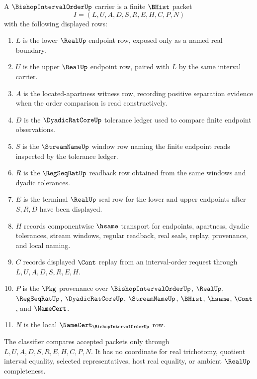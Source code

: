 \begin{definition}
\label{def:bishop-interval-order-carrier}
A $\BishopIntervalOrderUp$ carrier is a finite $\BHist$ packet
$$
I=(L,U,A,D,S,R,E,H,C,P,N)
$$
with the following displayed rows:
\begin{enumerate}
\item $L$ is the lower $\RealUp$ endpoint row, exposed only as a named real boundary.
\item $U$ is the upper $\RealUp$ endpoint row, paired with $L$ by the same interval carrier.
\item $A$ is the located-apartness witness row, recording positive separation evidence when the order comparison is read constructively.
\item $D$ is the $\DyadicRatCoreUp$ tolerance ledger used to compare finite endpoint observations.
\item $S$ is the $\StreamNameUp$ window row naming the finite endpoint reads inspected by the tolerance ledger.
\item $R$ is the $\RegSeqRatUp$ readback row obtained from the same windows and dyadic tolerances.
\item $E$ is the terminal $\RealUp$ seal row for the lower and upper endpoints after $S,R,D$ have been displayed.
\item $H$ records componentwise $\hsame$ transport for endpoints, apartness, dyadic tolerances, stream windows, regular readback, real seals, replay, provenance, and local naming.
\item $C$ records displayed $\Cont$ replay from an interval-order request through $L,U,A,D,S,R,E,H$.
\item $P$ is the $\Pkg$ provenance over $\BishopIntervalOrderUp$, $\RealUp$, $\RegSeqRatUp$, $\DyadicRatCoreUp$, $\StreamNameUp$, $\BHist$, $\hsame$, $\Cont$, and $\NameCert$.
\item $N$ is the local $\NameCert_{\BishopIntervalOrderUp}$ row.
\end{enumerate}
The classifier compares accepted packets only through $L,U,A,D,S,R,E,H,C,P,N$. It has no coordinate for real trichotomy, quotient interval equality, selected representatives, host real equality, or ambient $\RealUp$ completeness.
\end{definition}

